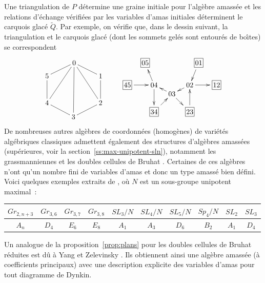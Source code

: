 \documentclass[brochure,12pt]{bourbaki}
\numberwithin{equation}{subsection}
\numberwithin{theorem}{section}
\renewcommand{\tilde}[1]{\widetilde{#1}}
\begin{document}
Une triangulation de $P$ d\'etermine une graine initiale
pour l'alg\`ebre amass\'ee et les relations d'\'echange v\'erifi\'ees
par les variables d'amas initiales d\'eterminent le carquois glac\'e $\tilde{Q}$.
Par exemple, on v\'erifie que, dans le dessin suivant, la triangulation et le carquois glac\'e
(dont les sommets gel\'es sont entour\'es de bo\^{\i}tes) se correspondent
\[
\begin{xy} 0;<0.5pt,0pt>:<0pt,-0.5pt>::
(76,0) *+{0} ="0",
(150,37) *+{1} ="1",
(150,112) *+{2} ="2",
(74,151) *+{3} ="3",
(0,112) *+{4} ="4",
(0,37) *+{5} ="5",
(275,0) *+{\framebox[3ex]{05}} ="6",
(300,62) *+{04} ="7",
(350,87) *+{03} ="8",
(400,62) *+{02} ="9",
(425,0) *+{\framebox[3ex]{01}} ="10",
(225,62) *+{\framebox[3ex]{45}} ="11",
(300,137) *+{\framebox[3ex]{34}} ="12",
(400,137) *+{\framebox[3ex]{23}} ="13",
(475,62) *+{\framebox[3ex]{12}} ="14",
"0", {\ar@{-}"1"},
"0", {\ar@{-}"2"},
"0", {\ar@{-}"3"},
"0", {\ar@{-}"4"},
"5", {\ar@{-}"0"},
"1", {\ar@{-}"2"},
"2", {\ar@{-}"3"},
"3", {\ar@{-}"4"},
"4", {\ar@{-}"5"},
"7", {\ar"6"},
"8", {\ar"7"},
"11", {\ar"7"},
"7", {\ar"12"},
"9", {\ar"8"},
"12", {\ar"8"},
"8", {\ar"13"},
"10", {\ar"9"},
"13", {\ar"9"},
"9", {\ar"14"},
\end{xy}
\]
De nombreuses autres alg\`ebres de coordonn\'ees (homog\`enes) de
vari\'et\'es alg\'ebriques classiques admettent \'egalement des
structures d'alg\`ebres amass\'ees (sup\'erieures, voir la
section~\ref{ss:max-unipotent-sln}), notamment les grassmanniennes
\cite{Scott06} et les doubles cellules de Bruhat
\cite{BerensteinFominZelevinsky05}. Certaines de ces alg\`ebres
n'ont qu'un nombre fini de variables d'amas et donc un type amass\'e
bien d\'efini. Voici quelques exemples extraits de \cite{FominZelevinsky03a},
o\`u $N$ est un sous-groupe unipotent maximal~:

\begin{tabular}{|c|c|c|c|c|c|c|c|c|c|} \hline
$Gr_{2,n+3}$ & $Gr_{3,6}$ & $Gr_{3,7}$ & $Gr_{3,8}$ & $SL_3/N$ & $SL_4/N$ & $SL_5/N$ & $Sp_4/N$ & $SL_2$ & $SL_3$ \\ \hline
$A_n$ & $D_4$ & $E_6$ & $E_8$ & $A_1$ & $A_3$ & $D_6$ & $B_2$ & $A_1$ & $D_4$  \\ \hline
\end{tabular}
\bigskip

Un analogue de la proposition~\ref{prop:plans} pour les doubles cellules
de Bruhat r\'eduites \cite{BerensteinZelevinsky01} est d\^u \`a
Yang et Zelevinsky \cite{YangZelevinsky09}. Ils obtiennent ainsi une
alg\`ebre amass\'ee (\`a coefficients principaux) avec une description
explicite des variables d'amas pour tout diagramme de Dynkin.
\end{document}
